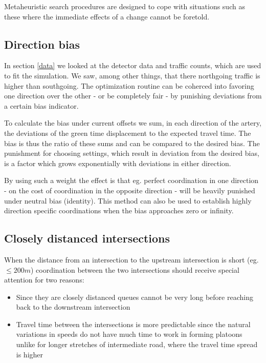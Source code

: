 Metaheuristic search procedures are designed to cope with situations such as these where the immediate effects of a change cannot be foretold.

\subsection{Direction bias}
In section \ref{data} we looked at the detector data and traffic counts, which are used to fit the simulation. We saw, among other things, that there northgoing traffic is higher than southgoing. The optimization routine can be coherced into favoring one direction over the other - or be completely fair - by punishing deviations from a certain bias indicator.

To calculate the bias under current offsets we sum, in each direction of the artery, the deviations of the green time displacement to the expected travel time. The bias is thus the ratio of these sums and can be compared to the desired bias. The punishment for choosing settings, which result in deviation from the desired bias, is a factor which grows exponentially with deviations in either direction.

By using such a weight the effect is that eg. perfect coordination in one direction - on the cost of coordination in the opposite direction - will be heavily punished under neutral bias (identity). This method can also be used to establish highly direction specific coordinations when the bias approaches zero or infinity.

\subsection{Closely distanced intersections}
When the distance from an intersection to the upstream intersection is short (eg. $\leq 200 m$) coordination between the two intersections should receive special attention for two reasons:

\begin{itemize}
\item Since they are closely distanced queues cannot be very long before reaching back to the downstream intersection
\item Travel time between the intersections is more predictable since the natural variations in speeds do not have much time to work in forming platoons unlike for longer stretches of intermediate road, where the travel time spread is higher
\end{itemize}

